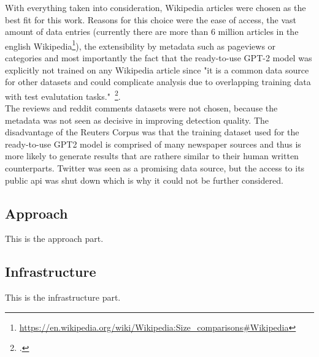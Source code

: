 With everything taken into consideration, Wikipedia articles were chosen as the best fit for this work.
Reasons for this choice were the ease of access, the vast amount of data entries (currently there are more than 6 million articles in the english Wikipedia\footnote{\url{https://en.wikipedia.org/wiki/Wikipedia:Size_comparisons\#Wikipedia}}), the extensibility by metadata such as pageviews or categories and most importantly the fact that the ready-to-use GPT-2 model was explicitly not trained on any Wikipedia article since "it is a common data source for other datasets and could complicate analysis due to overlapping training data with test evalutation tasks."~\footcite{radford2019language}. \\
The reviews and reddit comments datasets were not chosen, because the metadata was not seen as decisive in improving detection quality. The disadvantage of the Reuters Corpus was that the training dataset used for the ready-to-use GPT2 model is comprised of many newspaper sources and thus is more likely to generate results that are rathere similar to their human written counterparts. Twitter was seen as a promising data source, but the access to its public api was shut down which is why it could not be further considered.







\subsection{Approach}
\label{sec:approach}

This is the approach part.

\subsection{Infrastructure}
\label{sec:infrastructure}

This is the infrastructure part.